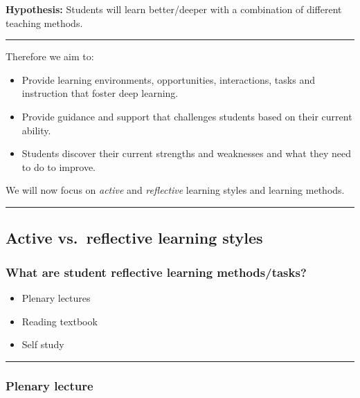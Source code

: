 \documentclass[]{article}
\providecommand{\tightlist}{%
  \setlength{\itemsep}{0pt}\setlength{\parskip}{0pt}}
\begin{document}
\textbf{Hypothesis:} Students will learn better/deeper with a
combination of different teaching methods.

\begin{center}\rule{0.5\linewidth}{\linethickness}\end{center}

Therefore we aim to:

\begin{itemize}
\tightlist
\item
  Provide learning environments, opportunities, interactions, tasks and
  instruction that foster deep learning.
\item
  Provide guidance and support that challenges students based on their
  current ability.
\item
  Students discover their current strengths and weaknesses and what they
  need to do to improve.
\end{itemize}

We will now focus on \emph{active} and \emph{reflective} learning styles
and learning methods.

\begin{center}\rule{0.5\linewidth}{\linethickness}\end{center}

\hypertarget{active-vs.reflective-learning-styles}{%
\subsection{Active vs.~reflective learning
styles}\label{active-vs.reflective-learning-styles}}

\hypertarget{what-are-student-reflective-learning-methodstasks}{%
\subsubsection{What are student reflective learning
methods/tasks?}\label{what-are-student-reflective-learning-methodstasks}}

\begin{itemize}
\tightlist
\item
  Plenary lectures
\item
  Reading textbook
\item
  Self study
\end{itemize}

\begin{center}\rule{0.5\linewidth}{\linethickness}\end{center}

\hypertarget{plenary-lecture}{%
\subsubsection{Plenary lecture}\label{plenary-lecture}}
\end{document}
